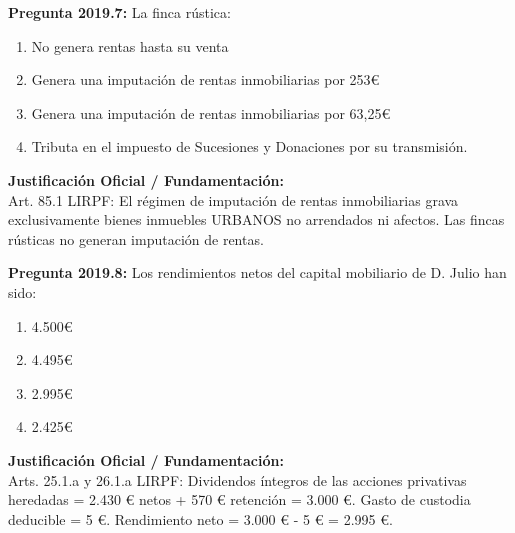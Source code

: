 \documentclass[11pt,a4paper,openany]{article}
\begin{document}
\noindent\textbf{\sffamily Pregunta 2019.7:} La finca rústica:\\[0.15cm]
\begin{enumerate}[label=\textbf{\alph*)},leftmargin=1.8em,itemsep=1.5pt,topsep=2pt,partopsep=0pt,parsep=0pt]
    \item No genera rentas hasta su venta
    \item Genera una imputación de rentas inmobiliarias por 253\euro{}
    \item Genera una imputación de rentas inmobiliarias por 63,25\euro{}
    \item Tributa en el impuesto de Sucesiones y Donaciones por su transmisión.
\end{enumerate}
\begin{solucionBox}
\textbf{Justificación Oficial / Fundamentación:}\\[0.1cm]
Art. 85.1 LIRPF: El régimen de imputación de rentas inmobiliarias grava exclusivamente bienes inmuebles URBANOS no arrendados ni afectos. Las fincas rústicas no generan imputación de rentas.
\end{solucionBox}
\vspace{0.35cm}

\noindent\textbf{\sffamily Pregunta 2019.8:} Los rendimientos netos del capital mobiliario de D. Julio han sido:\\[0.15cm]
\begin{enumerate}[label=\textbf{\alph*)},leftmargin=1.8em,itemsep=1.5pt,topsep=2pt,partopsep=0pt,parsep=0pt]
    \item 4.500\euro{}
    \item 4.495\euro{}
    \item 2.995\euro{}
    \item 2.425\euro{}
\end{enumerate}
\begin{solucionBox}
\textbf{Justificación Oficial / Fundamentación:}\\[0.1cm]
Arts. 25.1.a y 26.1.a LIRPF: Dividendos íntegros de las acciones privativas heredadas = 2.430 \euro{} netos + 570 \euro{} retención = 3.000 \euro{}. Gasto de custodia deducible = 5 \euro{}. Rendimiento neto = 3.000 \euro{} - 5 \euro{} = 2.995 \euro{}.
\end{solucionBox}
\vspace{0.35cm}
\end{document}
